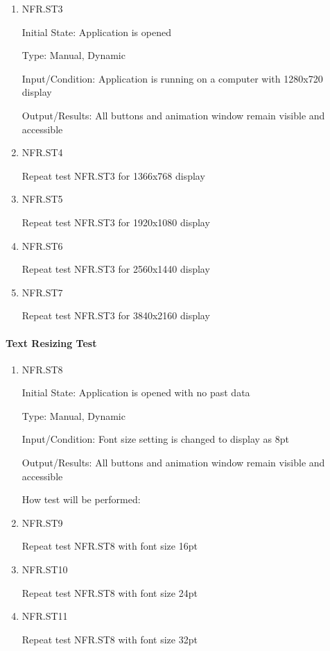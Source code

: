 \documentclass[12pt, titlepage]{article}
\begin{document}
\begin{enumerate}

\item{NFR.ST3\\}

Initial State: Application is opened

Type: Manual, Dynamic

Input/Condition: Application is running on a computer with 1280x720 display

Output/Results: All buttons and animation window remain visible and accessible

\item{NFR.ST4\\}

Repeat test NFR.ST3 for 1366x768 display

\item{NFR.ST5\\}

Repeat test NFR.ST3 for 1920x1080 display

\item{NFR.ST6\\}

Repeat test NFR.ST3 for 2560x1440 display

\item{NFR.ST7\\}

Repeat test NFR.ST3 for 3840x2160 display

\end{enumerate}

\paragraph{Text Resizing Test}

\begin{enumerate}

\item{NFR.ST8\\}

Initial State: Application is opened with no past data

Type: Manual, Dynamic

Input/Condition: Font size setting is changed to display as 8pt

Output/Results: All buttons and animation window remain visible and accessible

How test will be performed: 

\item{NFR.ST9\\}

Repeat test NFR.ST8 with font size 16pt

\item{NFR.ST10\\}

Repeat test NFR.ST8 with font size 24pt

\item{NFR.ST11\\}

Repeat test NFR.ST8 with font size 32pt

\end{enumerate}
\end{document}
